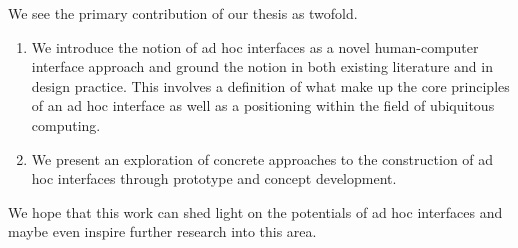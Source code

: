 We see the primary contribution of our thesis as twofold.

\begin{enumerate}
\item{We introduce the notion of ad hoc interfaces as a novel human-computer interface approach and ground the notion in both existing literature and in design practice. 
This involves a definition of what make up the core principles of an ad hoc interface as well as a positioning within the field of ubiquitous computing.}

\item{We present an exploration of concrete approaches to the construction of ad hoc interfaces through prototype and concept development.}
\end{enumerate}
We hope that this work can shed light on the potentials of ad hoc interfaces and maybe even inspire further research into this area.